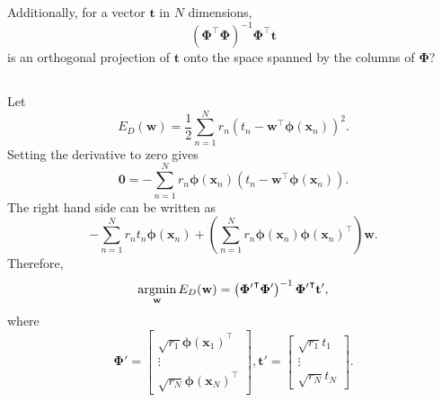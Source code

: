 Additionally, for a vector $\mathbf{t}$ in $N$ dimensions,
%
\begin{equation}
\left(
	\bm{\Phi} ^ \intercal
	\bm{\Phi}
\right) ^ {- 1}
\bm{\Phi} ^ \intercal
\mathbf{t}
\end{equation}
%
is an orthogonal projection of $\mathbf{t}$ onto the space spanned by the columns of $\mathbf{\Phi}$?


\subsection{}
\label{3.3}
Let
%
\begin{equation}
E_D (\mathbf{w})
=
\frac{1}{2}
\sum_{n = 1}^{N}
r_n
\left(
	t_n
	-
	\mathbf{w} ^ \intercal
	\bm{\phi} (\mathbf{x}_n)
\right) ^ 2.
\end{equation}
%
Setting the derivative to zero gives
%
\begin{equation}
\mathbf{0}
=
-
\sum_{n = 1}^{N}
r_n
\bm{\phi} (\mathbf{x}_n)
\left(
	t_n
	-
	\mathbf{w} ^ \intercal
	\bm{\phi} (\mathbf{x}_n)
\right).
\end{equation}
%
The right hand side can be written as
%
\begin{equation}
-
\sum_{n = 1}^{N}
r_n
t_n
\bm{\phi} (\mathbf{x}_n)
+
\left(
	\sum_{n = 1}^{N}
	r_n
	\bm{\phi} (\mathbf{x}_n)
	\bm{\phi} (\mathbf{x}_n) ^ \intercal
\right)
\mathbf{w}.
\end{equation}
%
Therefore, 
%
\begin{equation}
\operatorname*{arg min}_{\mathbf{w}}
E_D (\mathbf{w})
=
\left(
	{\bm{\Phi}'} ^ \intercal
	\bm{\Phi}'
\right) ^ {- 1}
{\bm{\Phi}'} ^ \intercal
\mathbf{t}',
\end{equation}
%
where
%
\[
\bm{\Phi}'
=
\begin{bmatrix}
\sqrt{r_1} \bm{\phi} (\mathbf{x}_1) ^ \intercal 
\\
\vdots 
\\
\sqrt{r_N} \bm{\phi} (\mathbf{x}_N) ^ \intercal
\end{bmatrix}
,
\bm{t}'
=
\begin{bmatrix}
\sqrt{r_1} t_1 
\\
\vdots 
\\
\sqrt{r_N} t_N
\end{bmatrix}
.
\]


